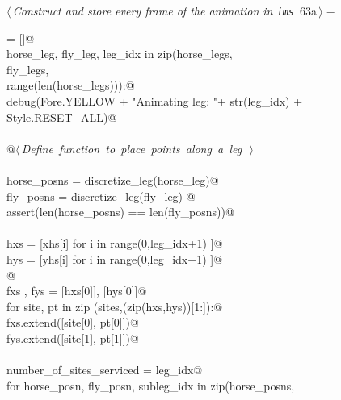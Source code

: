 \documentclass[11.5pt]{report}
\begin{document}
\begin{flushleft} \small
\begin{minipage}{\linewidth}\label{scrap96}\raggedright\small
{} $\langle\,${\itshape Construct and store every frame of the animation in \verb|ims|}\nobreak\ {\footnotesize {63a}}$\,\rangle\equiv$
\vspace{-1ex}
\begin{list}{}{} \item
\mbox{}\verb@ims = []@\\
\mbox{}\verb@for horse_leg, fly_leg, leg_idx in zip(horse_legs, \@\\
\mbox{}\verb@                                       fly_legs,   \@\\
\mbox{}\verb@                                       range(len(horse_legs))):@\\
\mbox{}\verb@     debug(Fore.YELLOW + "Animating leg: "+ str(leg_idx) + Style.RESET_ALL)@\\
\mbox{}\verb@@\\
\mbox{}\verb@     @\hbox{$\langle\,${\itshape Define function to place points along a leg}\nobreak\ {\footnotesize {}}$\,\rangle$}\verb@@\\
\mbox{}\verb@@\\
\mbox{}\verb@     horse_posns = discretize_leg(horse_leg)@\\
\mbox{}\verb@     fly_posns   = discretize_leg(fly_leg) @\\
\mbox{}\verb@     assert(len(horse_posns) == len(fly_posns))@\\
\mbox{}\verb@@\\
\mbox{}\verb@     hxs = [xhs[i] for i in range(0,leg_idx+1) ]@\\
\mbox{}\verb@     hys = [yhs[i] for i in range(0,leg_idx+1) ]@\\
\mbox{}\verb@           @\\
\mbox{}\verb@     fxs , fys = [hxs[0]], [hys[0]]@\\
\mbox{}\verb@     for site, pt in zip (sites,(zip(hxs,hys))[1:]):@\\
\mbox{}\verb@          fxs.extend([site[0], pt[0]])@\\
\mbox{}\verb@          fys.extend([site[1], pt[1]])@\\
\mbox{}\verb@@\\
\mbox{}\verb@     number_of_sites_serviced = leg_idx@\\
\mbox{}\verb@     for horse_posn, fly_posn, subleg_idx in zip(horse_posns, \@\\

\end{list}
\end{minipage}
\end{flushleft}
\end{document}

